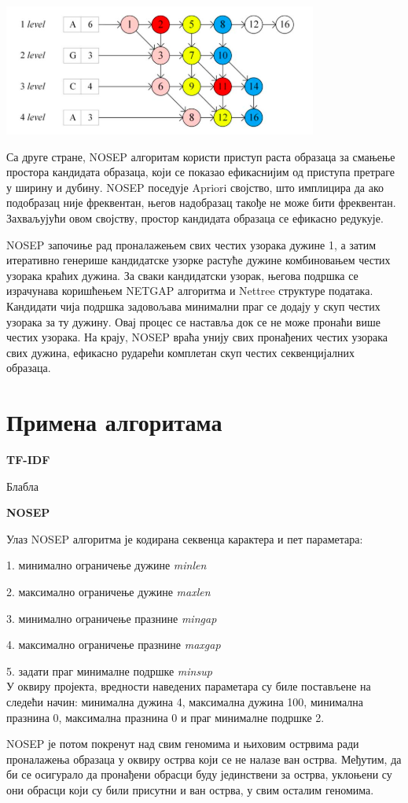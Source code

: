 \documentclass[12pt]{article}
\begin{document}
\begin{center}
\includegraphics[width=0.6\linewidth]{images/nettree.png}
\end{center}

Са друге стране, NOSEP алгоритам користи приступ раста образаца за смањење простора кандидата образаца, који се показао ефикаснијим од приступа претраге у ширину и дубину. NOSEP поседује Apriori својство, што имплицира да ако подобразац није фреквентан, његов надобразац такође не може бити фреквентан. Захваљујући овом својству, простор кандидата образаца се ефикасно редукује.

NOSEP започиње рад проналажењем свих честих узорака дужине 1, а затим итеративно генерише кандидатске узорке растуће дужине комбиновањем честих узорака краћих дужина. За сваки кандидатски узорак, његова подршка се израчунава коришћењем NETGAP алгоритма и Nettree структуре података. Кандидати чија подршка задовољава минимални праг се додају у скуп честих узорака за ту дужину. Овај процес се наставља док се не може пронаћи више честих узорака. На крају, NOSEP враћа унију свих пронађених честих узорака свих дужина, ефикасно рударећи комплетан скуп честих секвенцијалних образаца.

\section{Примена алгоритама}

\textbf{\large TF-IDF}

Блабла

\textbf{\large NOSEP}


Улаз NOSEP алгоритма је кодирана секвенца карактера и пет параметара:

1. минимално ограничење дужине \textit{minlen}

2. максимално ограничење дужине \textit{maxlen}

3. минимално ограничење празнине \textit{mingap}

4. максимално ограничење празнине \textit{maxgap}

5. задати праг минималне подршке \textit{minsup}\\


У оквиру пројекта, вредности наведених параметара су биле постављене на следећи начин: минимална дужина 4, максимална дужина 100, минимална празнина 0, максимална празнина 0 и праг минималне подршке 2.

NOSEP је потом покренут над свим геномима и њиховим острвима ради проналажења образаца у оквиру острва који се не налазе ван острва. Међутим, да би се осигурало да пронађени обрасци буду јединствени за острва, уклоњени су они обрасци који су били присутни и ван острва, у свим осталим геномима.


\newpage

\end{document}

